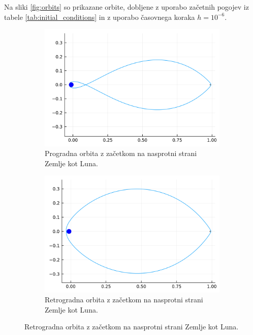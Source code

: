 \documentclass[11pt, titlepage]{article}
\begin{document}
Na sliki \ref{fig:orbits} so prikazane orbite, dobljene z uporabo začetnih pogojev iz tabele \ref{tab:initial_conditions} in z uporabo časovnega koraka $h = 10^{-6}$.
\begin{figure}[h]
    \centering
    \begin{subfigure}[b]{0.45\textwidth}
        \centering
        \includegraphics[width=\textwidth]{figures/free_return_orbit_1.png}
        \caption{Progradna orbita z začetkom na nasprotni strani Zemlje kot Luna.}
        \label{fig:orbit_1_sim}
    \end{subfigure}
    \hfill
    \begin{subfigure}[b]{0.45\textwidth}
        \centering
        \includegraphics[width=\textwidth]{figures/free_return_orbit_2.png}
        \caption{Retrogradna orbita z začetkom na nasprotni strani Zemlje kot Luna.}
        \label{fig:orbit_2_sim}
    \end{subfigure}


\end{figure}
\end{document}

